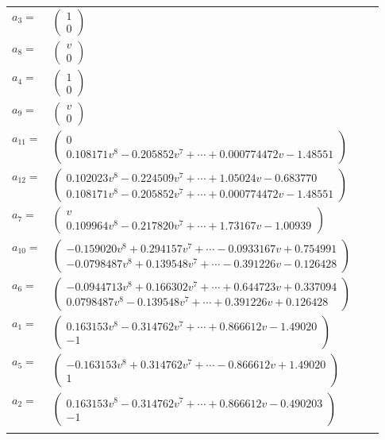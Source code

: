 \documentclass[1p]{elsarticle_modified}
\theoremstyle{definition}
\begin{document}
\begin{tabular}{m{7pt} m{180pt} m{7pt} m{180pt} }
\flushright $a_{3}=$&$\begin{pmatrix}1\\0\end{pmatrix}$ \\
\flushright $a_{8}=$&$\begin{pmatrix}v\\0\end{pmatrix}$ \\
\flushright $a_{4}=$&$\begin{pmatrix}1\\0\end{pmatrix}$ \\
\flushright $a_{9}=$&$\begin{pmatrix}v\\0\end{pmatrix}$ \\
\flushright $a_{11}=$&$\begin{pmatrix}0\\0.108171 v^{8}-0.205852 v^{7}+\cdots+0.000774472 v-1.48551\end{pmatrix}$ \\
\flushright $a_{12}=$&$\begin{pmatrix}0.102023 v^{8}-0.224509 v^{7}+\cdots+1.05024 v-0.683770\\0.108171 v^{8}-0.205852 v^{7}+\cdots+0.000774472 v-1.48551\end{pmatrix}$ \\
\flushright $a_{7}=$&$\begin{pmatrix}v\\0.109964 v^{8}-0.217820 v^{7}+\cdots+1.73167 v-1.00939\end{pmatrix}$ \\
\flushright $a_{10}=$&$\begin{pmatrix}-0.159020 v^{8}+0.294157 v^{7}+\cdots-0.0933167 v+0.754991\\-0.0798487 v^{8}+0.139548 v^{7}+\cdots-0.391226 v-0.126428\end{pmatrix}$ \\
\flushright $a_{6}=$&$\begin{pmatrix}-0.0944713 v^{8}+0.166302 v^{7}+\cdots+0.644723 v+0.337094\\0.0798487 v^{8}-0.139548 v^{7}+\cdots+0.391226 v+0.126428\end{pmatrix}$ \\
\flushright $a_{1}=$&$\begin{pmatrix}0.163153 v^{8}-0.314762 v^{7}+\cdots+0.866612 v-1.49020\\-1\end{pmatrix}$ \\
\flushright $a_{5}=$&$\begin{pmatrix}-0.163153 v^{8}+0.314762 v^{7}+\cdots-0.866612 v+1.49020\\1\end{pmatrix}$ \\
\flushright $a_{2}=$&$\begin{pmatrix}0.163153 v^{8}-0.314762 v^{7}+\cdots+0.866612 v-0.490203\\-1\end{pmatrix}$\\&\end{tabular}
\end{document}
